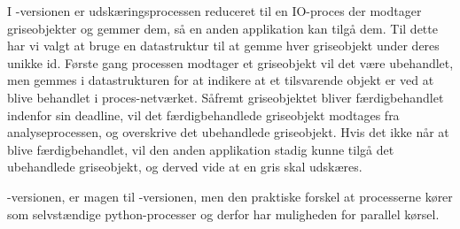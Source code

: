 I -versionen er udskæringsprocessen reduceret til en IO-proces der modtager griseobjekter og gemmer dem, så en anden applikation kan tilgå dem. Til dette har vi valgt at bruge en  datastruktur til at gemme  hver griseobjekt under deres unikke id. Første gang processen modtager et griseobjekt vil det være ubehandlet, men gemmes i datastrukturen for at indikere at et tilsvarende objekt er ved at blive behandlet i proces-netværket. Såfremt griseobjektet bliver færdigbehandlet indenfor sin deadline, vil det færdigbehandlede griseobjekt modtages fra analyseprocessen, og overskrive det ubehandlede griseobjekt. Hvis det ikke når at blive færdigbehandlet, vil den anden applikation stadig kunne tilgå det ubehandlede griseobjekt, og derved vide at en gris skal udskæres. 

-versionen, er magen til -versionen, men den praktiske forskel at processerne kører som selvstændige python-processer og derfor har muligheden for parallel kørsel. 

